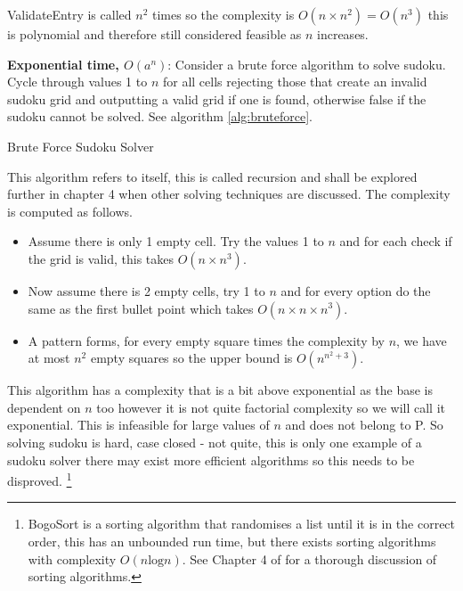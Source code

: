 \documentclass[a4paper,11pt]{report}
\begin{document}
ValidateEntry is called $n^2$ times so the complexity is $O(n\times n^2) = O(n^3)$ this is polynomial and therefore still considered feasible as $n$ increases. 
 
\textbf{Exponential time, $O(a^n)$}: Consider a brute force algorithm to solve sudoku. Cycle through values 1 to $n$ for all cells rejecting those that create an invalid sudoku grid and outputting a valid grid if one is found, otherwise false if the sudoku cannot be solved. See algorithm \ref{alg:bruteforce}.

\begin{algorithm}
\caption{Brute Force Sudoku Solver\label{alg:bruteforce}} 
\begin{algorithmic}
		\Else
		\EndIf
	\EndIf
		\EndIf
	\EndFor
\EndProcedure
\end{algorithmic}
\end{algorithm}

This algorithm refers to itself, this is called recursion and shall be explored further in chapter 4 when other solving techniques are discussed. The complexity is computed as follows. 
\begin{itemize}
\item Assume there is only 1 empty cell. Try the values 1 to $n$ and for each check if the grid is valid, this takes $O(n\times n^3)$.
\item Now assume there is 2 empty cells, try 1 to $n$ and for every option do the same as the first bullet point which takes $O(n\times n \times n^3)$.
\item A pattern forms, for every empty square times the complexity by $n$, we have at most $n^2$ empty squares so the upper bound is $O(n^{n^2+3})$.
\end{itemize}
This algorithm has a complexity that is a bit above exponential as the base is dependent on $n$ too however it is not quite factorial complexity so we will call it exponential. This is infeasible for large values of $n$ and does not belong to P. So solving sudoku is hard, case closed - not quite, this is only one example of a sudoku solver there may exist more efficient algorithms so this needs to be disproved. \footnote{BogoSort is a sorting algorithm that randomises a list until it is in the correct order, this has an unbounded run time, but there exists sorting algorithms with complexity $O(n\text{log}n)$. See Chapter 4 of \cite{heineman2016algorithms} for a thorough discussion of sorting algorithms.} 
\end{document}
